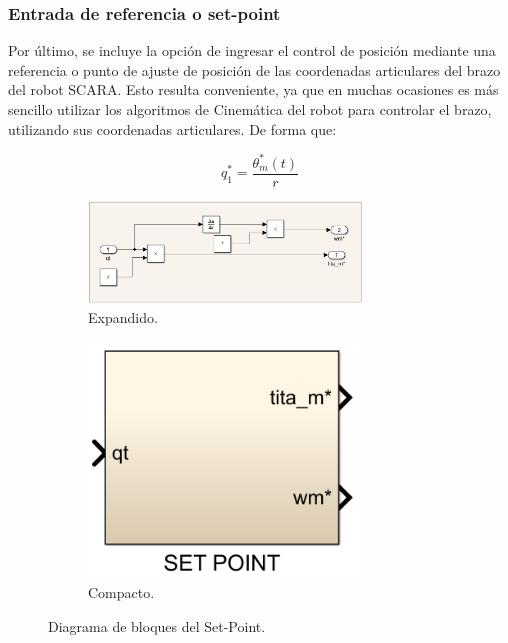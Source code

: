 \documentclass{article}
\begin{document}

\subsubsection{Entrada de referencia o set-point}

Por último, se incluye la opción de ingresar el control de posición mediante una referencia o punto de 
ajuste de posición de las coordenadas articulares del brazo del robot SCARA. Esto resulta conveniente, ya que 
en muchas ocasiones es más sencillo utilizar los algoritmos de Cinemática del robot para controlar 
el brazo, utilizando sus coordenadas articulares. De forma que:

\begin{equation}
    q_1^* = \frac{\theta_m^*(t)}{r}
\end{equation}


\begin{figure}[H]
    \begin{subfigure}[b]{0.75\textwidth}
        \centering
        \includegraphics[width=0.8\textwidth]{set_point.png}
        \caption{Expandido.}
    \end{subfigure}
    \begin{subfigure}[b]{0.24\textwidth}
        \centering
        \includegraphics[width=0.8\textwidth]{set_point_comp.png}
        \caption{Compacto.}
    \end{subfigure}
    \caption{Diagrama de bloques del Set-Point.}
\end{figure}
\end{document}
